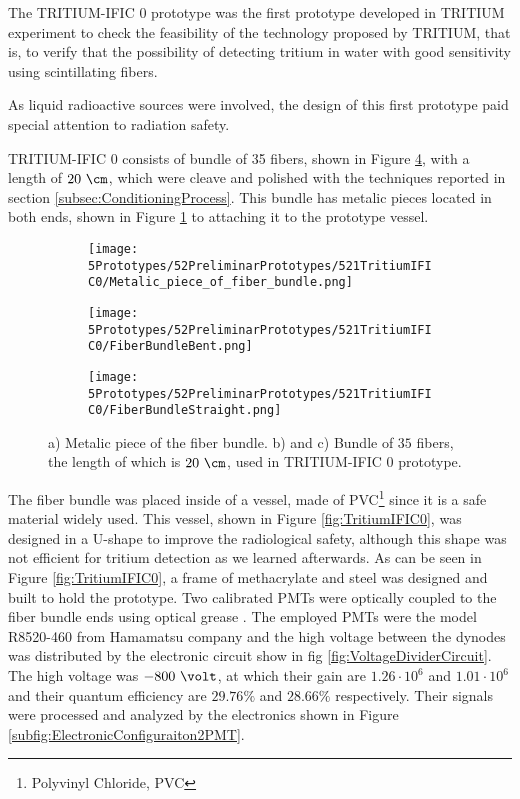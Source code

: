 The TRITIUM-IFIC 0 prototype was the first prototype developed in TRITIUM experiment to check the feasibility of the technology proposed by TRITIUM, that is, to verify that the possibility of detecting tritium in water with good sensitivity using scintillating fibers.

As liquid radioactive sources were involved, the design of this first prototype paid special attention to radiation safety.

TRITIUM-IFIC 0 consists of bundle of 35 fibers, shown in Figure \ref{fig:FiberBundleOfTritiumIFIC0}, with a length of $20~\cm$, which were cleave and polished with the techniques reported in section \ref{subsec:ConditioningProcess}. This bundle has metalic pieces located in both ends, shown in Figure \ref{subfig:MetalicPieceFiberBunchTritiumIFIC0} to attaching it to the prototype vessel.

\begin{figure}
\centering
    \begin{subfigure}[b]{0.5\textwidth}
    \centering
    \texttt{[image: 5Prototypes/52PreliminarPrototypes/521TritiumIFIC0/Metalic\_piece\_of\_fiber\_bundle.png]}  
    \caption{\label{subfig:MetalicPieceFiberBunchTritiumIFIC0}}
    \end{subfigure}
    \hfill
    \begin{subfigure}[b]{0.4\textwidth}
    \centering
    \texttt{[image: 5Prototypes/52PreliminarPrototypes/521TritiumIFIC0/FiberBundleBent.png]}  
    \caption{\label{subfig:FiberBunchTritiumIFIC0Bent}}
    \end{subfigure}
    \hfill
    \begin{subfigure}[b]{0.7\textwidth}
    \centering
    \texttt{[image: 5Prototypes/52PreliminarPrototypes/521TritiumIFIC0/FiberBundleStraight.png]}  
    \caption{\label{subfig:FiberBunchTritiumIFIC0}}
    \end{subfigure}
 \caption{a) Metalic piece of the fiber bundle. b) and c) Bundle of $35$ fibers, the length of which is $20~\cm$, used in TRITIUM-IFIC 0 prototype.}
 \label{fig:FiberBundleOfTritiumIFIC0}
\end{figure}

The fiber bundle was placed inside of a vessel, made of PVC\footnote{Polyvinyl Chloride, PVC}  since it is a safe material widely used. This vessel, shown in Figure \ref{fig:TritiumIFIC0}, was designed in a U-shape to improve the radiological safety, although this shape was not efficient for tritium detection as we learned afterwards. As can be seen in Figure \ref{fig:TritiumIFIC0}, a frame of methacrylate and steel was designed and built to hold the prototype. Two calibrated PMTs were optically coupled to the fiber bundle ends using optical grease \cite{OpticalGrease}. The employed PMTs were the model R8520-460 from Hamamatsu company \cite{DataSheetPMTs} and the high voltage between the dynodes was distributed by the electronic circuit show in fig  \ref{fig:VoltageDividerCircuit}. The high voltage was $-800~\volt$, at which their gain are $1.26 \cdot{} 10^6$ and $1.01 \cdot{} 10^6$ and their quantum efficiency are $29.76\%$ and $28.66\%$ respectively. Their signals were processed and analyzed by the electronics shown in Figure \ref{subfig:ElectronicConfiguraiton2PMT}.

